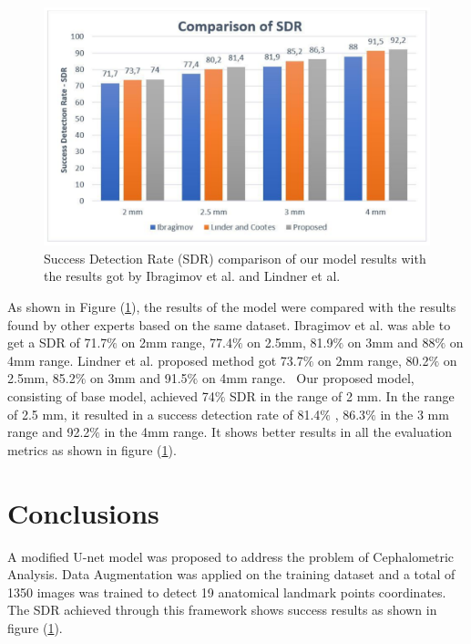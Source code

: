 \documentclass{elektr}
\begin{document}
\begin{figure}[H]
	\begin{center}
		\includegraphics[width=5.76in]{./media/image4}
		\caption{Success Detection Rate (SDR) comparison of our model results with the results got by Ibragimov et al. \cite{ref4} and Lindner et al. \cite{ref3}}
		\label{fig4}
	\end{center}\vs{-4mm}
\end{figure}




\tab As shown in Figure (\ref{fig4}), the results of the model were compared with the results found by other experts based on the same dataset. Ibragimov et al. \cite{ref4} was able to get a SDR of 71.7$\%$  on 2mm range, 77.4$\%$  on 2.5mm, 81.9$\%$  on 3mm and 88$\%$  on 4mm range. Lindner et al. \cite{ref3} proposed method got 73.7$\%$  on 2mm range, 80.2$\%$  on 2.5mm, 85.2$\%$  on 3mm and 91.5$\%$  on 4mm range. \  Our proposed model, consisting of base model, achieved 74$\%$  SDR in the range of 2 mm. In the range of 2.5 mm, it resulted in a success detection rate of 81.4$\%$ , 86.3$\%$  in the 3 mm range and 92.2$\%$  in the 4mm range. It shows better results in all the evaluation metrics as shown in figure (\ref{fig4}). 

\section{Conclusions}
\tab A modified U-net model was proposed to address the problem of Cephalometric Analysis. Data Augmentation was applied on the training dataset and a total of 1350 images was trained to detect 19 anatomical landmark points coordinates. The SDR achieved through this framework shows success results as shown in figure (\ref{fig4}).  
\end{document}
